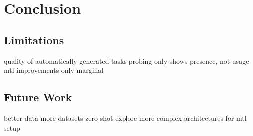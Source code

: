 \chapter{Conclusion}
\label{chap:conclusion}

\section{Limitations}
\label{sec:limitations}
quality of automatically generated tasks
probing only shows presence, not usage
mtl improvements only marginal
\section{Future Work}
\label{sec:future}
better data
more datasets
zero shot
explore more complex architectures for mtl setup
